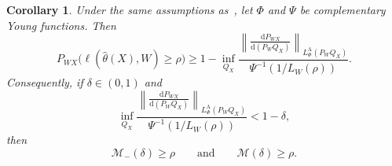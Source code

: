 \documentclass[11pt]{article}
\newtheorem{corollary}[theorem]{Corollary}
\theoremstyle{definition}
\theoremstyle{remark}
\newcommand{\1}{\boldsymbol{1}}
\begin{document}
\begin{corollary}
\label{cor:amemiyaHolder}
Under the same assumptions as~, let
$\Phi$ and $\Psi$ be complementary Young functions. Then
\begin{equation}
P_{WX}\bigl(\ell(\widehat\theta(X),W)\geq\rho\bigr)
\geq
1-
\inf_{Q_X}
\frac{
\left\|
\frac{\mathrm dP_{WX}}{\mathrm d(P_WQ_X)}
\right\|_{L_\Phi^{\mathrm A}(P_WQ_X)}
}{
\Psi^{-1}\left(1/L_W(\rho)\right)
}.
\end{equation}
Consequently, if $\delta\in(0,1)$ and
\begin{equation}
\inf_{Q_X}
\frac{
\left\|
\frac{\mathrm dP_{WX}}{\mathrm d(P_WQ_X)}
\right\|_{L_\Phi^{\mathrm A}(P_WQ_X)}
}{
\Psi^{-1}\left(1/L_W(\rho)\right)
}
<
1-\delta,
\end{equation}
then
\begin{equation}
\mathcal M_{-}(\delta)\geq\rho
\qquad\text{and}\qquad
\mathcal M(\delta)\geq\rho.
\end{equation}
\end{corollary}
\end{document}
